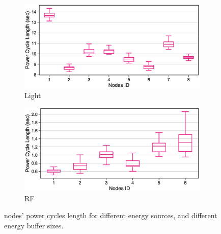 \begin{figure}[t]
		\begin{subfigure}{.49\columnwidth}
			\centering
			\includegraphics[width=\textwidth]{figures/light_power_cycles_len}
			\caption{Light}
		\end{subfigure}\hfill
		\begin{subfigure}{.49\columnwidth}
			\centering
			\includegraphics[width=\textwidth]{figures/rf_power_cycles_len}
			\caption{RF}
		\end{subfigure}\hfill
		\caption{nodes' power cycles length for different energy sources, and different energy buffer sizes.}
		\label{fig:power_cycles}
\end{figure} 


